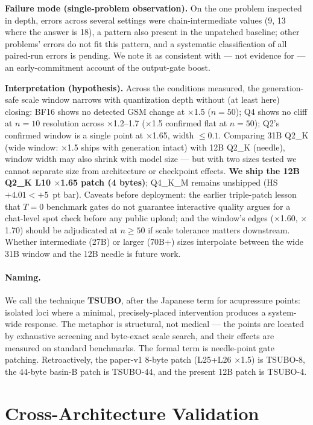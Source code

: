 \documentclass[11pt]{article}
\begin{document}
\textbf{Failure mode (single-problem observation).} On the one problem
inspected in depth, errors across several settings were
chain-intermediate values (9, 13 where the answer is 18), a pattern also
present in the unpatched baseline; other problems' errors do not fit
this pattern, and a systematic classification of all paired-run errors
is pending. We note it as consistent with --- not evidence for --- an
early-commitment account of the output-gate boost.

\textbf{Interpretation (hypothesis).} Across the conditions measured,
the generation-safe scale window narrows with quantization depth without
(at least here) closing: BF16 shows no detected GSM change at
$\times$1.5 ($n{=}50$); Q4 shows no cliff at $n{=}10$ resolution across
$\times$1.2--1.7 ($\times$1.5 confirmed flat at $n{=}50$); Q2's
confirmed window is a single point at $\times$1.65, width $\leq 0.1$.
Comparing 31B Q2\_K (wide window: $\times$1.5 ships with generation
intact) with 12B Q2\_K (needle), window width may also shrink with model
size --- but with two sizes tested we cannot separate size from
architecture or checkpoint effects. \textbf{We ship the 12B Q2\_K L10
$\times$1.65 patch (4 bytes)}; Q4\_K\_M remains unshipped (HS $+4.01 <
+5$~pt bar). Caveats before deployment: the earlier triple-patch lesson that $T{=}0$
benchmark gates do not guarantee interactive quality argues for a
chat-level spot check before any public upload; and the window's edges
($\times$1.60, $\times$1.70) should be adjudicated at $n \geq 50$ if
scale tolerance matters downstream. Whether intermediate (27B) or larger
(70B+) sizes interpolate between the wide 31B window and the 12B needle
is future work.

\paragraph{Naming.} We call the technique \textbf{TSUBO}, after the
Japanese term for acupressure points: isolated loci where a minimal,
precisely-placed intervention produces a system-wide response. The
metaphor is structural, not medical --- the points are located by
exhaustive screening and byte-exact scale search, and their effects are
measured on standard benchmarks. The formal term is needle-point gate
patching. Retroactively, the paper-v1 8-byte patch (L25+L26
$\times$1.5) is TSUBO-8, the 44-byte basin-B patch is TSUBO-44, and the
present 12B patch is TSUBO-4.

\section{Cross-Architecture Validation}
\label{sec:cross_arch}
\end{document}
